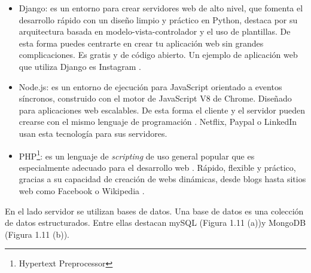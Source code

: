 \begin{itemize}
    \item Django: es un entorno para crear servidores web de alto nivel, que fomenta el desarrollo rápido con un diseño limpio y práctico en Python, destaca por su arquitectura basada en  modelo-vista-controlador y el uso de plantillas. De esta forma puedes centrarte en crear tu aplicación web sin grandes complicaciones. Es gratis y de código abierto\cite{django}. Un ejemplo de aplicación web que utiliza Django es Instagram \cite{insta}.
    \item Node.js: es un entorno de ejecución para JavaScript orientado a eventos síncronos, construido con el motor de JavaScript V8 de Chrome. Diseñado para aplicaciones web escalables. De esta forma el cliente y el servidor pueden crearse con el mismo lenguaje de programación \cite{node}. Netflix, Paypal o LinkedIn usan esta tecnología para sus servidores\cite{nodenetflix}. 
    
    \item PHP\footnote{Hypertext Preprocessor}: es un lenguaje de \textit{scripting} de uso general popular que es especialmente adecuado para el desarrollo web \cite{php1}. Rápido, flexible y práctico, gracias a su capacidad de creación de webs dinámicas, desde blogs hasta sitios web como Facebook o Wikipedia \cite{php2}.
    
\end{itemize}

En el lado servidor se utilizan bases de datos. Una base de datos es una colección de datos estructurados. Entre ellas destacan mySQL (Figura 1.11 (a))y MongoDB (Figura 1.11 (b)). 


